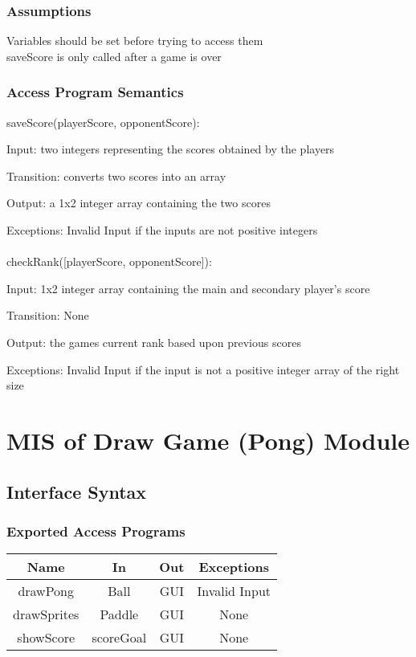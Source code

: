 \documentclass[12pt, titlepage]{article}
\begin{document}
		\subsubsection{Assumptions}
		Variables should be set before trying to access them \\
		saveScore is only called after a game is over
		
		\subsubsection{Access Program Semantics}
		saveScore(playerScore, opponentScore):
		
		Input: two integers representing the scores obtained by the players
		
		Transition: converts two scores into an array
		
		Output: a 1x2 integer array containing the two scores
		
		Exceptions: Invalid Input if the inputs are not positive integers \\
		\\
		checkRank([playerScore, opponentScore]):
		
		Input: 1x2 integer array containing the main and secondary player's score
		
		Transition: None
		
		Output: the games current rank based upon previous scores
		
		Exceptions: Invalid Input if the input is not a positive integer array of the right size

\section{MIS of Draw Game (Pong) Module}
		\subsection{Interface Syntax}
		\subsubsection{Exported Access Programs}
		\begin{tabular}[pos]{|c|c|c|c|}
			\hline
			\textbf{Name}& \textbf{In} & \textbf{Out} & \textbf{Exceptions} \\ \hline
			drawPong & Ball & GUI & Invalid Input \\ \hline
			drawSprites & Paddle & GUI & None \\ \hline
			showScore & scoreGoal & GUI & None \\ \hline
		\end{tabular}
		
\end{document}
